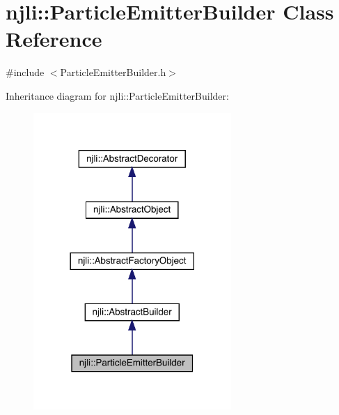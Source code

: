 \hypertarget{classnjli_1_1_particle_emitter_builder}{}\section{njli\+:\+:Particle\+Emitter\+Builder Class Reference}
\label{classnjli_1_1_particle_emitter_builder}


{\ttfamily \#include $<$Particle\+Emitter\+Builder.\+h$>$}



Inheritance diagram for njli\+:\+:Particle\+Emitter\+Builder\+:\nopagebreak
\begin{figure}[H]
\begin{center}
\leavevmode
\includegraphics[width=213pt]{classnjli_1_1_particle_emitter_builder__inherit__graph}
\end{center}
\end{figure}


